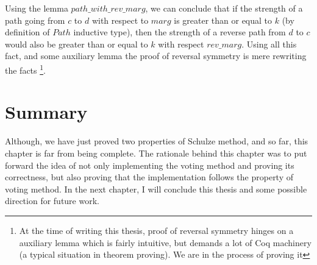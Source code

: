 Using the lemma $path\_with\_rev\_marg$, we can conclude that if the strength of 
a path going from $c$ to $d$ with respect to $marg$ is greater than or equal to $k$ 
(by definition of $Path$ inductive type), then the strength of a reverse path from $d$ to 
$c$ would also be greater than or equal to $k$ with respect $rev\_marg$. 
Using all this fact, and some auxiliary  lemma 
the proof of reversal symmetry is mere rewriting the facts
\footnote{At the time of writing this thesis, proof of reversal 
symmetry hinges on a auxiliary lemma which 
is fairly intuitive, but demands a lot of  Coq machinery (a typical situation 
in theorem proving). We are in the process of proving it}. 

 	
 
 \section{Summary}
 Although, we have just proved two properties of Schulze method, and so far, this chapter 
 is far from being complete. The rationale behind this chapter was to put forward the idea of 
 not only implementing the voting method and proving its correctness, but also proving that the implementation 
 follows the property of voting method. In the next chapter, I will conclude this thesis and some possible 
 direction for future work.  
 
 
 